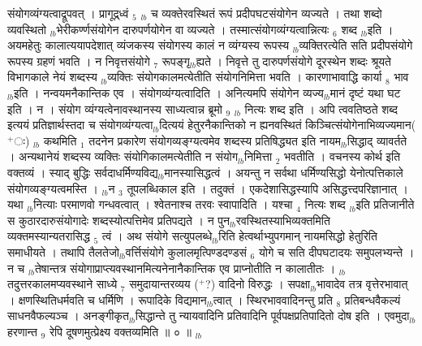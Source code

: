 \documentclass[article,12pt,a4paper]{memoir}%
\newcommand{\add}[1]{($^{+}$#1)}
\newcounter{parCount}
\begin{document}
संयोगव्यंग्यत्वाद्रूपवत् । प्रागूद्र्ध्वं {\tiny $_{5}$} {\tiny $_{lb}$} च व्यक्तेरवस्थितं रूपं प्रदीपघटसंयोगेन व्यज्यते । तथा शब्दो व्यवस्थितो {\tiny $_{lb}$}भेरीकर्ण्णसंयोगेन दारुपर्णयोगेन वा व्यज्यते । तस्मात्संयोगव्यंग्यत्वान्नित्यः {\tiny $_{6}$} शब्द {\tiny $_{lb}$}इति । अयमहेतुः कालात्ययापदेशात् व्यंजकस्य संयोगस्य कालं न व्यंग्यस्य रूपस्य {\tiny $_{lb}$}व्यक्तिरत्येति सति प्रदीपसंयोगे रूपस्य ग्रहणं भवति । न निवृत्तसंयोगे {\tiny $_{7}$} रूपङ्गृ{\tiny $_{lb}$}ह्यते । निवृत्ते तु दारुपर्णसंयोगे दूरस्थेन शब्दः श्रूयते विभागकाले नेयं शब्दस्य {\tiny $_{lb}$}व्यक्तिः संयोगकालमत्येतीति संयोगनिमित्ता भवति । कारणाभावाद्धि कार्या {\tiny $_{8}$} भाव {\tiny $_{lb}$}इति । नन्वयमनैकान्तिक एव । संयोगव्यंग्यत्वादिति । अनित्यमपि संयोगेन व्यज्य{\tiny $_{lb}$}मानं दृष्टं यथा घट इति । न । संयोग व्यंग्यत्वेनावस्थानस्य साध्यत्वान्न ब्रूमो {\tiny $_{9}$} \leavevmode{} {\tiny $_{lb}$} नित्यः शब्द इति । अपि त्ववतिष्ठते शब्द इत्ययं प्रतिज्ञार्थस्तदा च संयोगव्यंग्यत्वा{\tiny $_{lb}$}दित्ययं हेतुरनैकान्तिको न ह्यनवस्थितं किञ्चित्संयोगेनाभिव्यज्यमान\add{ः} {\tiny $_{lb}$} कथमिति {\tiny $_{1}$} तदनेन प्रकारेण संयोगव्यङ्ग्यत्वमेव शब्दस्य प्रतिषिद्ध्यत इति नायम{\tiny $_{lb}$}सिद्धाद् व्यावर्तते । अन्यथानेयं शब्दस्य व्यक्तिः संयोगिकालमत्येतीति न संयोग{\tiny $_{lb}$}निमित्ता {\tiny $_{2}$} भवतीति । वचनस्य कोर्थ इति वक्तव्यं । स्याद् बुद्धिः सर्वदाधर्मिण्यविद्य{\tiny $_{lb}$}मानस्यासिद्धत्वं । अयन्तु न सर्वथा धर्मिण्यसिद्धो येनोत्पत्तिकाले संयोगव्यङ्ग्यत्वमस्ति । {\tiny $_{lb}$}न {\tiny $_{3}$} तूपलब्धिकाल इति । तदुक्तं । एकदेशासिद्धस्यापि असिद्धत्त्दपरिज्ञानात् । यथा {\tiny $_{lb}$}नित्याः परमाणवो गन्धवत्वात् । श्वेतनाश्च तरवः स्वापादिति । यश्चा {\tiny $_{4}$} नित्यः शब्द {\tiny $_{lb}$}इति प्रतिजानीते स कुठारदारुसंयोगादेः शब्दस्योत्पत्तिमेव प्रतिपद्यते । न पुन{\tiny $_{lb}$}रवस्थितस्याभिव्यक्तमिति व्यक्तमस्यान्यतरासिद्ध {\tiny $_{5}$} त्वं । अथ संयोगे सत्युपलब्धे{\tiny $_{lb}$}रिति हेत्वर्थाभ्युपगमान् नायमसिद्धो हेतुरिति समाधीयते । तथापि तैलतेजो{\tiny $_{lb}$}वर्त्तिसंयोगे कुलालमृत्पिण्डदण्डसं {\tiny $_{6}$} योगे च सति दीपघटादयः समुपलभ्यन्ते । न च {\tiny $_{lb}$}तेषान्तत्र संयोगाप्राप्त्यवस्थानमित्यनेनानैकान्तिक एव प्राप्नोतीति न कालातीतः । {\tiny $_{lb}$}तदुत्तरकालमप्यवस्थाने साध्ये {\tiny $_{7}$} समुदायान्तरव्यय \add{?} वादिनो विरुद्धः । सपक्षा{\tiny $_{lb}$}भावादेव तत्र वृत्तेरभावात् । क्षणस्थितिधर्मवति च धर्मिणि । रूपादिके विद्यमान{\tiny $_{lb}$}त्वात् । स्थिरभाववादिनन्तु प्रति {\tiny $_{8}$} प्रतिबन्धवैकल्यं साधनवैफल्यञ्च । अनङ्गीकृत{\tiny $_{lb}$}सिद्धान्ते तु न्यायवादिनि प्रतिवादिनि पूर्वपक्षप्रतिपादितो दोष इति । एवमुदा{\tiny $_{lb}$}हरणान्त {\tiny $_{9}$} \leavevmode{} रेपि दूषणमुत्प्रेक्ष्य वक्तव्यमिति ॥ ० ॥
	{}
	\pend%
      {\tiny $_{lb}$}
\end{document}
